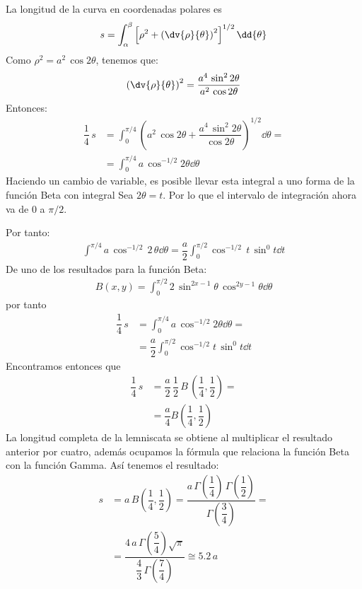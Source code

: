 La longitud de la curva en coordenadas polares es
\begin{align*}
s = \int_{\alpha}^{\beta} \left[ \rho^{2} + \left( \dv{\rho}{\theta} \right)^{2} \right]^{1/2} \dd{\theta}
\end{align*}
Como $\rho^{2} = a^{2} \, \cos 2 \theta$, tenemos que:
\begin{align*}
\left( \dv{\rho}{\theta} \right)^{2} = \dfrac{a^{4} \, \sin^{2} 2 \theta}{a^{2} \, \cos 2 \theta}
\end{align*}
Entonces:
\begin{align*}
\dfrac{1}{4} \, s &= \int_{0}^{\pi/4} \left( a^{2} \, \cos 2 \theta + \dfrac{a^{4} \, \sin^{2} 2 \theta}{\cos 2 \theta} \right)^{1/2} \dd{\theta} = \\[1em]
&= \int_{0}^{\pi/4} a \, \cos^{-1/2} 2 \theta \dd{\theta}
\end{align*}
Haciendo un cambio de variable, es posible llevar esta integral a uno forma de la función Beta con integral Sea $2 \theta = t$. Por lo que el intervalo de integración ahora va de $0$ a $\pi/2$.
\par
Por tanto:
\begin{align*}
\int_{}^{\pi/4} a \, \cos^{-1/2} \, 2 \, \theta \dd{\theta} = \dfrac{a}{2} \int_{0}^{\pi/2} \cos^{-1/2} \, t \, \sin^{0} t \dd{t}
\end{align*}
De uno de los resultados para la función Beta:
\begin{align*}
B(x, y) = \int_{0}^{\pi/2} 2 \, \sin^{2x-1} \theta \, \cos^{2y-1} \theta \dd{\theta}
\end{align*}
por tanto
\begin{align*}
\dfrac{1}{4} \, s &= \int_{0}^{\pi/4} a \, \cos^{-1/2} 2 \theta \dd{\theta} =  \\[0.5em]
&= \dfrac{a}{2} \int_{0}^{\pi/2} \cos^{-1/2} t \, \sin^{0} t \dd{t}
\end{align*}
Encontramos entonces que
\begin{align*}
\dfrac{1}{4} \, s &= \dfrac{a}{2} \, \dfrac{1}{2} \, B \, \left(\dfrac{1}{4}, \dfrac{1}{2} \right) = \\[1em]
&= \dfrac{a}{4} B\left(\dfrac{1}{4}, \dfrac{1}{2} \right)
\end{align*}
La longitud completa de la lemniscata se obtiene al multiplicar el resultado anterior por cuatro, además ocupamos la fórmula que relaciona la función Beta con la función Gamma. Así tenemos el resultado:
\begin{align*}
s &= a \, B\left(\dfrac{1}{4}, \dfrac{1}{2} \right) = \dfrac{a \, \Gamma \left( \dfrac{1}{4} \right) \, \Gamma \left( \dfrac{1}{2} \right) }{\Gamma \left( \dfrac{3}{4} \right)} = \\
&= \dfrac{4 \, a \, \Gamma \left( \dfrac{5}{4} \right) \sqrt{\pi}}{\dfrac{4}{3} \, \Gamma \left( \dfrac{7}{4} \right)} \cong 5.2 \, a
\end{align*}

